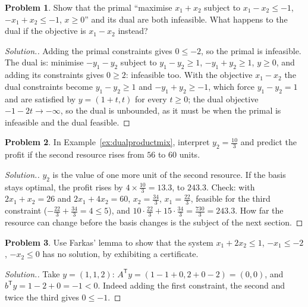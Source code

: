 \documentclass[11pt,a4paper]{article}
\numberwithin{equation}{section}
\theoremstyle{definition}
\newtheorem{problemx}{Problem}[subsection]
\newenvironment{problem}{\begin{problemx}}{\end{problemx}}
\newenvironment{solution}
  {\renewcommand{\qedsymbol}{}\begin{proof}[\textit{Solution}.]}
  {\end{proof}}
\begin{document}
\begin{problem}
\label{prob:bothinfeasible}
Show that the primal ``maximise $x_1 + x_2$ subject to $x_1 - x_2 \leq -1$, $-x_1 + x_2 \leq -1$, $x \geq 0$'' and its dual are both infeasible. What happens to the dual if the objective is $x_1 - x_2$ instead?
\end{problem}

\begin{solution}
Adding the primal constraints gives $0 \leq -2$, so the primal is infeasible. The dual is: minimise $-y_1 - y_2$ subject to $y_1 - y_2 \geq 1$, $-y_1 + y_2 \geq 1$, $y \geq 0$, and adding its constraints gives $0 \geq 2$: infeasible too. With the objective $x_1 - x_2$ the dual constraints become
$y_1 - y_2 \geq 1$ and $-y_1 + y_2 \geq -1$, which force $y_1 - y_2 = 1$ and are satisfied by $y = (1 + t, t)$ for every $t \geq 0$; the dual objective $-1 - 2t \to -\infty$, so the dual is unbounded, as it must be when the primal is infeasible and the dual feasible.
\end{solution}

\begin{problem}
In Example~\ref{ex:dualproductmix}, interpret $y_2 = \frac{10}3$ and predict the profit if the second resource rises from $56$ to $60$ units.
\end{problem}

\begin{solution}
$y_2$ is the value of one more unit of the second resource. If the basis stays optimal, the profit rises by $4 \times \frac{10}3 = 13.3$, to $243.3$. Check: with $2x_1 + x_2 = 26$ and $2x_1 + 4x_2 = 60$, $x_2 = \frac{34}3$, $x_1 = \frac{22}3$, feasible for the third constraint ($-\frac{22}3 + \frac{34}3 = 4 \leq 5$), and
$10\cdot\frac{22}3 + 15\cdot\frac{34}3 = \frac{730}3 = 243.3$. How far the resource can change before the basis changes is the subject of the next section.
\end{solution}

\begin{problem}
Use Farkas' lemma to show that the system $x_1 + 2x_2 \leq 1$, $-x_1 \leq -2$, $-x_2 \leq 0$ has no solution, by exhibiting a certificate.
\end{problem}

\begin{solution}
Take $y = (1, 1, 2)$: $A^{\mathsf T}y = (1 - 1 + 0, 2 + 0 - 2) = (0, 0)$, and $b^{\mathsf T}y = 1 - 2 + 0 = -1 < 0$. Indeed adding the first constraint, the second and twice the third gives $0 \leq -1$.
\end{solution}
\end{document}
